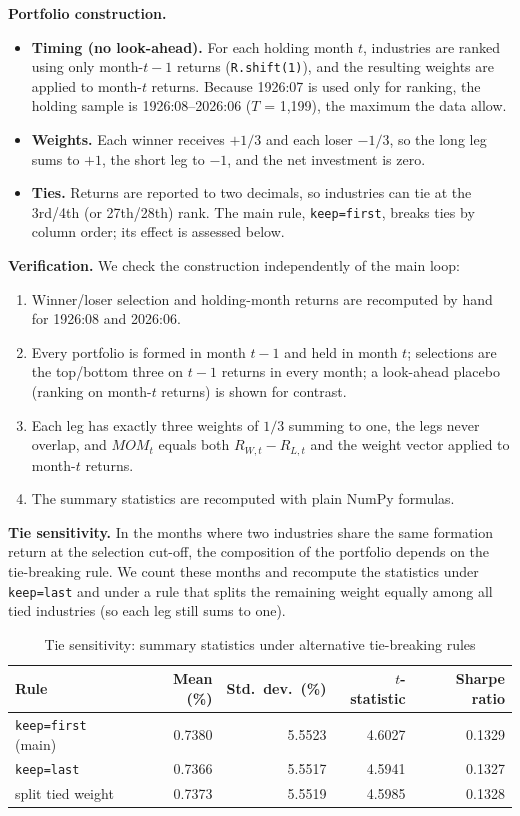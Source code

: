 \documentclass[11pt]{article}
\begin{document}
\textbf{Portfolio construction.}
\begin{itemize}
  \item \textbf{Timing (no look-ahead).} For each holding month $t$, industries are ranked using only month-$t-1$ returns (\texttt{R.shift(1)}), and the resulting weights are applied to month-$t$ returns. Because 1926:07 is used only for ranking, the holding sample is 1926:08--2026:06 ($T$ = 1,199), the maximum the data allow.
  \item \textbf{Weights.} Each winner receives $+1/3$ and each loser $-1/3$, so the long leg sums to $+1$, the short leg to $-1$, and the net investment is zero.
  \item \textbf{Ties.} Returns are reported to two decimals, so industries can tie at the 3rd/4th (or 27th/28th) rank. The main rule, \texttt{keep=\textquotedbl{}first\textquotedbl{}}, breaks ties by column order; its effect is assessed below.
\end{itemize}
 
\textbf{Verification.} We check the construction independently of the main loop:
\begin{enumerate}
  \item Winner/loser selection and holding-month returns are recomputed by hand for 1926:08 and 2026:06.
  \item Every portfolio is formed in month $t-1$ and held in month $t$; selections are the top/bottom three on $t-1$ returns in every month; a look-ahead placebo (ranking on month-$t$ returns) is shown for contrast.
  \item Each leg has exactly three weights of $1/3$ summing to one, the legs never overlap, and $MOM_t$ equals both $R_{W,t}-R_{L,t}$ and the weight vector applied to month-$t$ returns.
  \item The summary statistics are recomputed with plain NumPy formulas.
\end{enumerate}
 
\textbf{Tie sensitivity.} In the months where two industries share the same formation return at the selection cut-off, the composition of the portfolio depends on the tie-breaking rule. We count these months and recompute the statistics under \texttt{keep=\textquotedbl{}last\textquotedbl{}} and under a rule that splits the remaining weight equally among all tied industries (so each leg still sums to one).
 
\begin{table}[H]
\centering
\caption*{Tie sensitivity: summary statistics under alternative tie-breaking rules}
\begin{tabular}{lrrrr}
\toprule
Rule & Mean (\%) & Std.\ dev.\ (\%) & $t$-statistic & Sharpe ratio \\
\midrule
 
\texttt{keep=\textquotesingle{}first\textquotesingle{}} (main) & 0.7380 & 5.5523 & 4.6027 & 0.1329 \\
\texttt{keep=\textquotesingle{}last\textquotesingle{}} & 0.7366 & 5.5517 & 4.5941 & 0.1327 \\
split tied weight & 0.7373 & 5.5519 & 4.5985 & 0.1328 \\
\bottomrule
\end{tabular}
\end{table}
 
\end{document}
